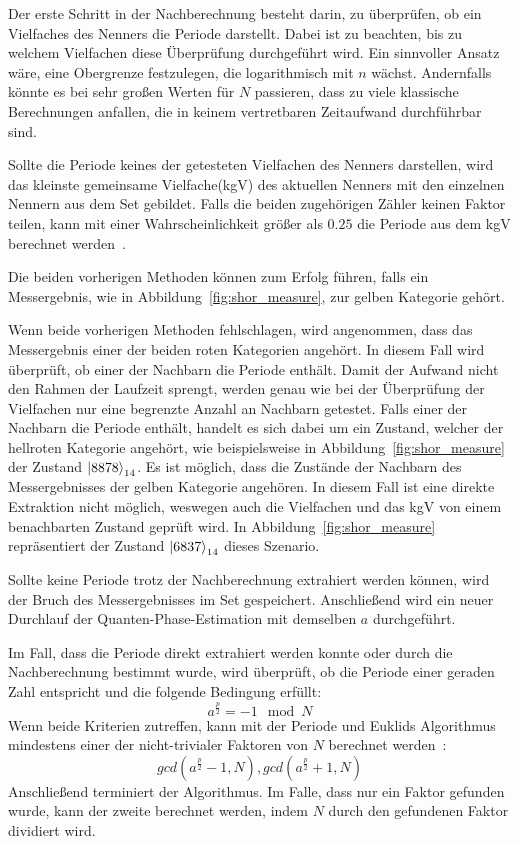Der erste Schritt in der Nachberechnung besteht darin, 
zu überprüfen, ob ein Vielfaches des Nenners die Periode darstellt.
Dabei ist zu beachten, bis zu welchem Vielfachen diese Überprüfung durchgeführt wird. 
Ein sinnvoller Ansatz wäre, eine Obergrenze festzulegen, die logarithmisch mit \(n\) wächst.
Andernfalls könnte es bei sehr großen Werten für \(N\) passieren, 
dass zu viele klassische Berechnungen anfallen, die in keinem vertretbaren Zeitaufwand durchführbar sind.

Sollte die Periode keines der getesteten Vielfachen des Nenners darstellen, 
wird das kleinste gemeinsame Vielfache(kgV) des aktuellen Nenners mit den einzelnen Nennern aus dem Set gebildet.
Falls die beiden zugehörigen Zähler keinen Faktor teilen, 
kann mit einer Wahrscheinlichkeit größer als \(0.25\) die Periode aus dem kgV berechnet werden~\autocite*[231]{nielsen_chuang_2010}.

Die beiden vorherigen Methoden können zum Erfolg führen, 
falls ein Messergebnis, wie in Abbildung~\ref{fig:shor_measure}, 
zur gelben Kategorie gehört. 

Wenn beide vorherigen Methoden fehlschlagen, 
wird angenommen, dass das Messergebnis einer der beiden roten Kategorien angehört.
In diesem Fall wird überprüft, ob einer der Nachbarn die Periode enthält.
Damit der Aufwand nicht den Rahmen der Laufzeit sprengt, 
werden genau wie bei der Überprüfung der Vielfachen
nur eine begrenzte Anzahl an Nachbarn getestet.
Falls einer der Nachbarn die Periode enthält, 
handelt es sich dabei um ein Zustand, 
welcher der hellroten Kategorie angehört, 
wie beispielsweise in Abbildung~\ref{fig:shor_measure} der Zustand \(\ket{8878}_{14}\).
Es ist möglich, 
dass die Zustände der Nachbarn des Messergebnisses der gelben Kategorie angehören.
In diesem Fall ist eine direkte Extraktion nicht möglich, 
weswegen auch die Vielfachen und das kgV von einem benachbarten Zustand geprüft wird.
In Abbildung~\ref{fig:shor_measure} repräsentiert der Zustand \(\ket{6837}_{14}\) dieses Szenario.

Sollte keine Periode trotz der Nachberechnung extrahiert werden können, 
wird der Bruch des Messergebnisses im Set gespeichert.
Anschließend wird ein neuer Durchlauf der Quanten-Phase-Estimation 
mit demselben \(a\) durchgeführt.

Im Fall, dass die Periode direkt extrahiert werden konnte oder 
durch die Nachberechnung bestimmt wurde, wird überprüft, 
ob die Periode einer geraden Zahl entspricht und die folgende Bedingung erfüllt:
\[a^{\frac{p}{2}} = -1 \mod N\]
Wenn beide Kriterien zutreffen, 
kann mit der Periode und 
Euklids Algorithmus mindestens einer der nicht-trivialer Faktoren von \(N\) berechnet werden~\cite{Shor_1997}:
\[gcd(a^{\frac{p}{2}}-1, N), gcd(a^{\frac{p}{2}}+1, N)\]
Anschließend terminiert der Algorithmus. 
Im Falle, dass nur ein Faktor gefunden wurde, kann der zweite berechnet werden, 
indem \(N\) durch den gefundenen Faktor dividiert wird.

